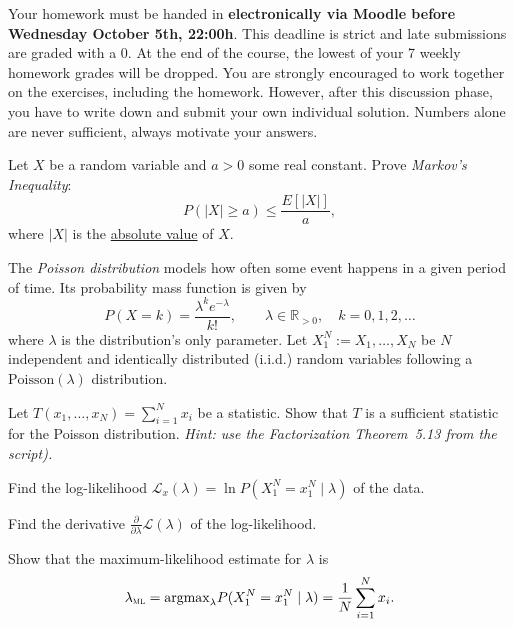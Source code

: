 \documentclass[a4paper,10pt,landscape,twocolumn]{scrartcl}
\newcommand\deadline{Wednesday October 5th, 22:00h}
\begin{document}
\homeworkproblems

{\sffamily\noindent
Your homework must be handed in \textbf{electronically via Moodle before \deadline}.  This deadline is strict and late submissions are graded with a 0. At the end of the course, the lowest of your 7 weekly homework grades will be dropped. You are strongly encouraged to work together on the exercises, including the homework. However, after this discussion phase, you have to write down and submit your own individual solution. Numbers alone are never sufficient, always motivate your answers.
}

\begin{exercise}
	Let $X$ be a random variable and $a > 0$ some real constant. Prove 
	\emph{Markov's Inequality}:
	\[
	P(|X| \ge a) \le \frac{E[|X|]}{a},
	\]
	where $|X|$ is the \href{https://en.wikipedia.org/wiki/Absolute_value}{absolute value} of $X$.
\end{exercise}


\begin{exercise}
	The \emph{Poisson distribution} models how often some event happens in a given period of time. Its probability mass function is given by
	\[
	P(X = k) = {\frac {\lambda ^{k}e^{-\lambda }}{k!}}, \qquad \lambda \in \mathbb{R}_{>0}, \quad k=0,1,2,\dots
	\]
	where $\lambda$ is the distribution's only parameter. 
	Let $X_1^N := X_1, \dots, X_N$ be $N$ independent and identically distributed (i.i.d.) random variables following a $\text{Poisson}(\lambda)$ distribution.
		
	\begin{subex}[1pt]
	Let $T(x_1, \dots, x_N) = \sum_{i=1}^N x_i$ be a
        statistic. Show that $T$ is a sufficient statistic for the
        Poisson distribution. \emph{Hint: use the Factorization
          Theorem~5.13 from the script).}
	\end{subex}

	\begin{subex}[1pt]
	Find the log-likelihood $\mathcal L_x(\lambda) = \ln P(X_1^N =
        x_1^N\mid \lambda)$ of the data.
	\end{subex}
	
	\begin{subex}[0.5pt]
		Find the derivative $\frac{\partial}{\partial \lambda} \mathcal L(\lambda)$ of the log-likelihood.
	\end{subex}
	
	\begin{subex}[1pt]
		Show that the maximum-likelihood estimate for $\lambda$ is
		\[
			\lambda_\textsc{ml} = \text{argmax}_\lambda
                        P(X_1^N = x_1^N \mid \lambda) = \frac{1}{N}\sum_{i=1}^N x_i.
		\]
	\end{subex}
	
\end{exercise}
\end{document}
